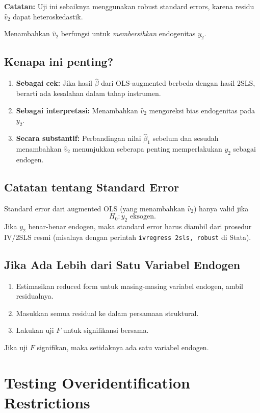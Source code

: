 \documentclass[]{article}
\begin{document}
\textbf{Catatan:} Uji ini sebaiknya menggunakan robust standard errors, 
karena residu $\hat{v}_2$ dapat heteroskedastik.

Menambahkan $\hat{v}_2$ berfungsi untuk \textit{membersihkan} endogenitas $y_2$.

\subsection*{Kenapa ini penting?}
\begin{enumerate}
    \item \textbf{Sebagai cek:}  
    Jika hasil $\hat{\beta}$ dari OLS-augmented berbeda dengan hasil 2SLS, berarti ada kesalahan dalam tahap instrumen.
    \item \textbf{Sebagai interpretasi:}  
    Menambahkan $\hat{v}_2$ mengoreksi bias endogenitas pada $y_2$.
    \item \textbf{Secara substantif:}  
    Perbandingan nilai $\hat{\beta}_1$ sebelum dan sesudah menambahkan $\hat{v}_2$ menunjukkan 
    seberapa penting memperlakukan $y_2$ sebagai endogen.
\end{enumerate}

\subsection*{Catatan tentang Standard Error}
Standard error dari augmented OLS (yang menambahkan $\hat{v}_2$) hanya valid jika
\[
H_0: y_2 \text{ eksogen.}
\]
Jika $y_2$ benar-benar endogen, maka standard error harus diambil dari prosedur IV/2SLS resmi
(misalnya dengan perintah \texttt{ivregress 2sls, robust} di Stata).

\subsection*{Jika Ada Lebih dari Satu Variabel Endogen}
\begin{enumerate}
    \item Estimasikan reduced form untuk masing-masing variabel endogen, ambil residualnya.
    \item Masukkan semua residual ke dalam persamaan struktural.
    \item Lakukan uji $F$ untuk signifikansi bersama.
\end{enumerate}

Jika uji $F$ signifikan, maka setidaknya ada satu variabel endogen.
\section*{Testing Overidentification Restrictions}
\end{document}

